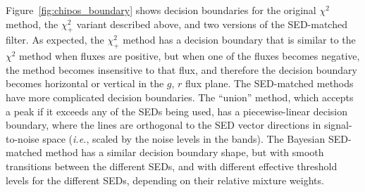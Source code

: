 \documentclass[11pt,letterpaper,linenumbers]{aastex7}
\newcommand{\latin}[1]{\emph{#1}}
\newcommand{\ie}{\latin{i.e.}}
\newcommand{\figref}[1]{\mbox{Figure~\ref{#1}}}
\newcommand{\chipos}{\chi_+}
\begin{document}
\figref{fig:chipos_boundary} shows decision boundaries for the
original $\chi^2$ method, the $\chipos^2$ variant described above, and
two versions of the SED-matched filter.  As expected, the $\chipos^2$
method has a decision boundary that is similar to the $\chi^2$ method
when fluxes are positive, but when one of the fluxes becomes negative,
the method becomes insensitive to that flux, and therefore the
decision boundary becomes horizontal or vertical in the $g$, $r$ flux
plane.  The SED-matched methods have more complicated decision
boundaries.  The ``union'' method, which accepts a peak if it exceeds
any of the SEDs being used, has a piecewise-linear decision boundary,
where the lines are orthogonal to the SED vector directions in
signal-to-noise space (\ie, scaled by the noise levels in the bands).
The Bayesian SED-matched method has a similar decision boundary shape,
but with smooth transitions between the different SEDs, and with
different effective threshold levels for the different SEDs, depending
on their relative mixture weights.
\end{document}
